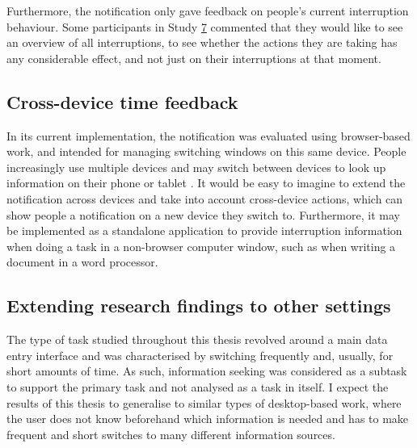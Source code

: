 Furthermore, the notification only gave feedback on people’s current interruption behaviour. Some participants in Study \hyperref[st:Study7]{7} commented that they would like to see an overview of all interruptions, to see whether the actions they are taking has any considerable effect, and not just on their interruptions at that moment.

\subsection{Cross-device time feedback}
In its current implementation, the notification was evaluated using browser-based work, and intended for managing switching windows on this same device. People increasingly use multiple devices and may switch between devices to look up information on their phone or tablet \citep{Dearman2008, Jokela2015a, Murphy2016}. It would be easy to imagine to extend the notification across devices and take into account cross-device actions, which can show people a notification on a new device they switch to. Furthermore, it may be implemented as a standalone application to provide interruption information when doing a task in a non-browser computer window, such as when writing a document in a word processor.

\subsection{Extending research findings to other settings}
The type of task studied throughout this thesis revolved around a main data entry interface and was characterised by switching frequently and, usually, for short amounts of time. As such, information seeking was considered as a subtask to support the primary task and not analysed as a task in itself. 
I expect the results of this thesis to generalise to similar types of desktop-based work, where the user does not know beforehand which information is needed and has to make frequent and short switches to many different information sources. 

